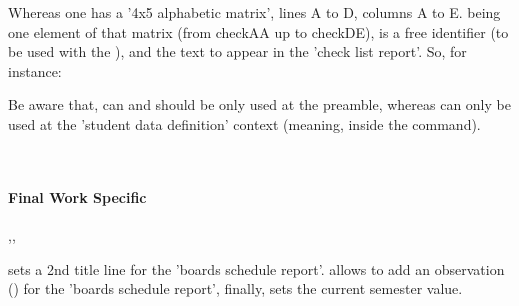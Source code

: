 \documentclass[article,nogeometry,english,tocdepth=3,secdepth=3]{ufrgscca} %
\begin{document}
\begin{codedescribe}{\checkdef}%
\begin{codesyntax}%
\end{codesyntax}
Whereas one has a '4x5 alphabetic matrix', lines A to D, columns A to E.  being one element of that matrix (from checkAA up to checkDE),  is a free identifier (to be used with the \tsmacro{\checklist}{}), and  the text to appear in the 'check list report'.  So, for instance:

\begin{codestore}[st=d.check]


\end{codestore}



Be aware that, \tsmacro{\checkdef}{} can and should be only used at the preamble, whereas \tsmacro{\checklist}{} can only be used at the 'student data definition' context (meaning, inside the \tsmacro{\NewStudent}{} command).
\end{codedescribe}\\


\paragraph{Final Work Specific}

\begin{codedescribe}{\boardstitleB,\boardsOBS,\TCCperiod}
	\begin{codesyntax}%
	\end{codesyntax}
  sets a 2nd title line for the 'boards schedule report'. \tsmacro{\boardsOBS}{} allows to add an observation () for the 'boards schedule report', finally, \tsmacro{\TCCperiod} sets the current semester value.
\end{codedescribe}
\end{document}
